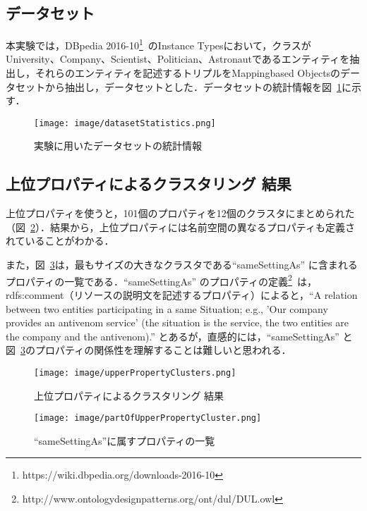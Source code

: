 \subsection{データセット}
\label{sec:datasets}
本実験では，DBpedia 2016-10\footnote{https://wiki.dbpedia.org/downloads-2016-10}\ のInstance Typesにおいて，クラスがUniversity、Company、Scientist、Politician、Astronautであるエンティティを抽出し，それらのエンティティを記述するトリプルをMappingbased Objectsのデータセットから抽出し，データセットとした．データセットの統計情報を図~\ref{fig:datasetStatistics}に示す．
%
\begin{figure}[h]
\centering
\texttt{[image: image/datasetStatistics.png]}
\caption{\small
実験に用いたデータセットの統計情報
}
\label{fig:datasetStatistics}
\end{figure}
%
\subsection{上位プロパティによるクラスタリング 結果}
\label{sec:upperPropertyClusteringResult}
上位プロパティを使うと，101個のプロパティを12個のクラスタにまとめられた（図~\ref{fig:upperPropertyClusters}）．結果から，上位プロパティには名前空間の異なるプロパティも定義されていることがわかる．

また，図~\ref{fig:partOfUpperPropertyCluster}は，最もサイズの大きなクラスタである``sameSettingAs'' に含まれるプロパティの一覧である．``sameSettingAs'' のプロパティの定義\footnote{http://www.ontologydesignpatterns.org/ont/dul/DUL.owl}\ は，rdfs:comment（リソースの説明文を記述するプロパティ）によると，``A relation between two entities participating in a same Situation; e.g., 'Our company provides an antivenom service' (the situation is the service, the two entities are the company and the antivenom).'' とあるが，直感的には，``sameSettingAs'' と図~\ref{fig:partOfUpperPropertyCluster}のプロパティの関係性を理解することは難しいと思われる．
%
\begin{figure}[h]
\centering
\texttt{[image: image/upperPropertyClusters.png]}
\caption{\small
上位プロパティによるクラスタリング 結果
}
\label{fig:upperPropertyClusters}
\end{figure}
%
\begin{figure}[h]
\centering
\texttt{[image: image/partOfUpperPropertyCluster.png]}
\caption{\small
``sameSettingAs''に属すプロパティの一覧
}
\label{fig:partOfUpperPropertyCluster}
\end{figure}
%
